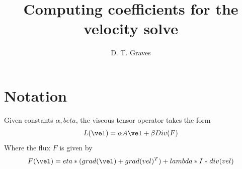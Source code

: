 \documentclass{article}
\begin{document}
\title{Computing coefficients for the velocity solve}
\author{  D. T. Graves }
\maketitle
\section{Notation}
Given constants $\alpha, beta$,
the viscous tensor operator takes the form
\begin{equation}
  L(\vel) = \alpha A \vel + \beta Div(F)
\end{equation}
Where the flux $F$ is given by
\begin{equation}
  F(\vel) = eta*(grad(\vel)  + grad(vel)^T) + lambda*I*div(vel)
\end{equation}
\end{document}
